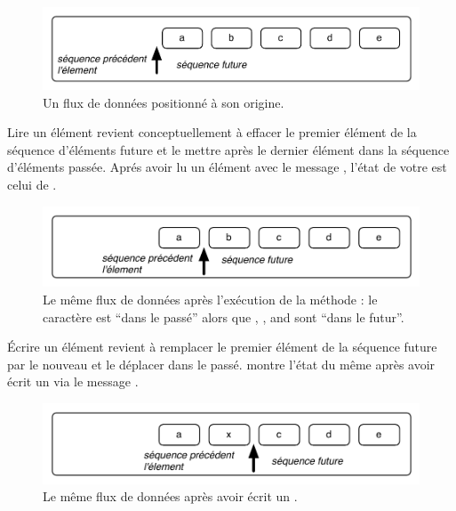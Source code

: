 \documentclass[a4paper,10pt,twoside]{book}
\begin{document}
\begin{figure}[ht]
\centerline{\includegraphics[scale=0.5]{_abcdeStef}}
\caption{Un flux de donn\'ees positionn\'e \`a son origine.}
\vspace{.2in}
\end{figure}

Lire un \'el\'ement revient conceptuellement \`a effacer le premier \'el\'ement de la s\'equence d'\'el\'ements future et le mettre apr\`es le dernier \'el\'ement dans la s\'equence d'\'el\'ements pass\'ee.
Apr\'es avoir lu un \'el\'ement avec le message , l'\'etat de votre \stream est celui de .

\begin{figure}[ht]
\centerline{\includegraphics[scale=0.5]{a_bcdeStef}}
\caption{Le m\^eme flux de donn\'ees apr\`es l'ex\'ecution de la m\'ethode : le caract\`ere  est ``dans le pass\'e'' alors que , ,  and  sont ``dans le futur''.}
\vspace{.2in}
\end{figure}

\'Ecrire un \'el\'ement revient \`a remplacer le premier \'el\'ement de la s\'equence future par le nouveau et le d\'eplacer dans le pass\'e.  montre l'\'etat du m\^eme \stream apr\`es avoir \'ecrit un  via le message  .

\begin{figure}[h!t]
\centerline{\includegraphics[scale=0.5]{ax_cdeStef}}
\caption{Le m\^eme flux de donn\'ees apr\`es avoir \'ecrit un .}
\vspace{.2in}
\end{figure}
\end{document}
